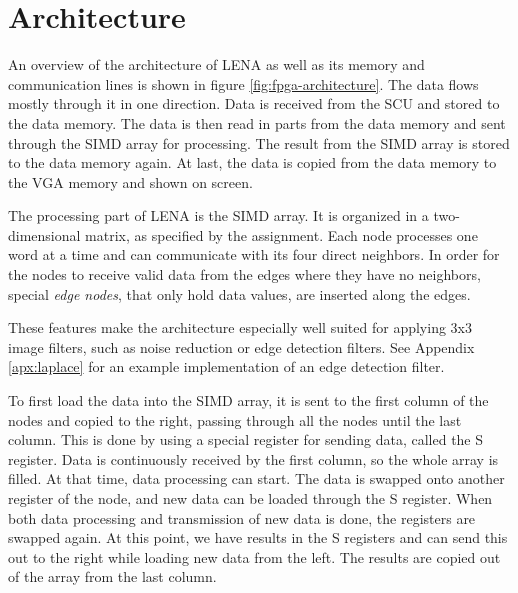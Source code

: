 \section{Architecture}



An overview of the architecture of \ac{LENA} as well as its memory and
communication lines is shown in figure \ref{fig:fpga-architecture}. The data
flows mostly through it in one direction. Data is received from the SCU and
stored to the data memory. The data is then read in parts from the data memory
and sent through the \ac{SIMD} array for processing. The result from the
\ac{SIMD} array is stored to the data memory again.  At last, the data is copied
from the data memory to the \ac{VGA} memory and shown on screen.

The processing part of \ac{LENA} is the \ac{SIMD} array. It is organized
in a two-dimensional matrix, as specified by the assignment. Each node
processes one word at a time and can communicate with its four direct
neighbors. In order for the nodes to receive valid data from the edges
where they have no neighbors, special \emph{edge nodes}, that only hold
data values, are inserted along the edges.

These features make the architecture especially well suited for applying
3x3 image filters, such as noise reduction or edge detection filters.
See Appendix \ref{apx:laplace} for an example implementation of an edge
detection filter. 

To first load the data into the \ac{SIMD} array, it is sent to the first column
of the nodes and copied to the right, passing through all the nodes until the
last column. This is done by using a special register for sending data, called
the S register. Data is continuously received by the first column, so the whole
array is filled. At that time, data processing can start. The data is swapped
onto another register of the node, and new data can be loaded through the S
register. When both data processing and transmission of new data is done, the
registers are swapped again. At this point, we have results in the S registers
and can send this out to the right while loading new data from the left. The
results are copied out of the array from the last column.

